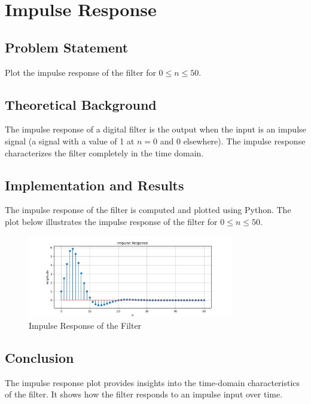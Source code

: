 \item[(f)]
\section{Impulse Response}

\subsection*{Problem Statement}
Plot the impulse response of the filter for \(0 \leq n \leq 50\).

\subsection*{Theoretical Background}
The impulse response of a digital filter is the output when the input is an impulse signal (a signal with a value of 1 at \( n = 0 \) and 0 elsewhere). The impulse response characterizes the filter completely in the time domain.

\subsection*{Implementation and Results}
The impulse response of the filter is computed and plotted using Python. The plot below illustrates the impulse response of the filter for \(0 \leq n \leq 50\).

\begin{figure}[h]
    \centering
    \includegraphics[width=0.8\textwidth]{fig/ex3_f_impulse_response.png}
    \caption{Impulse Response of the Filter}
    \label{fig:ex3_f_impulse_response}
\end{figure}

\subsection*{Conclusion}
The impulse response plot provides insights into the time-domain characteristics of the filter. It shows how the filter responds to an impulse input over time.
